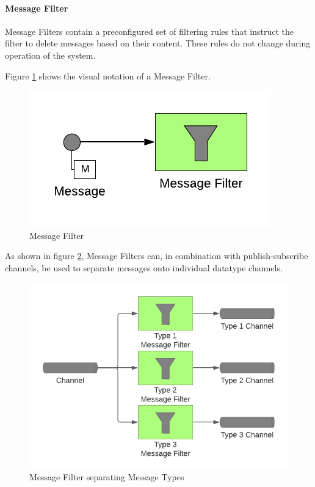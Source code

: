 \paragraph{Message Filter}

Message Filters contain a preconfigured set of filtering rules that instruct the filter to delete messages based on their content. These rules do not change during operation of the system.

Figure \ref{messaging:filter1} shows the visual notation of a Message Filter.

\begin{figure}[H]
    \centering
    \includegraphics[scale=0.6]{Diagrams/Messaging/8. Message Filter.pdf}
    \caption{Message Filter}
    \label{messaging:filter1}
\end{figure}

As shown in figure \ref{messaging:filter2}, Message Filters can, in combination with publish-subscribe channels, be used to separate messages onto individual datatype channels.

\begin{figure}[H]
    \centering
    \includegraphics[scale=0.6]{Diagrams/Messaging/9. Message Filter.pdf}
    \caption{Message Filter separating Message Types}
    \label{messaging:filter2}
\end{figure}

